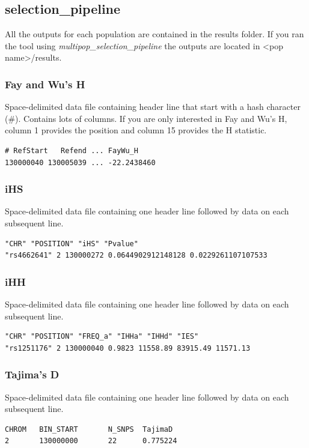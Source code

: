 \documentclass[a4paper,10pt]{article}
\begin{document}
\subsection{selection\_pipeline}
All the outputs for each population are contained in the results folder. If you ran the tool using \emph{multipop\_selection_pipeline} the outputs are located in <pop name>/results. 
\subsubsection{Fay and Wu's H}
Space-delimited data file containing header line that start with a hash character (\#). Contains lots of columns. If you are only interested in Fay and Wu's H, column 1 provides the position and column 15 provides the H statistic. \\
\begin{verbatim}
# RefStart   Refend ... FayWu_H
130000040 130005039 ... -22.2438460
\end{verbatim}
\subsubsection{iHS}
Space-delimited data file containing one header line followed by data on each subsequent line.\\
\begin{verbatim}
"CHR" "POSITION" "iHS" "Pvalue"
"rs4662641" 2 130000272 0.0644902912148128 0.0229261107107533
\end{verbatim}
\subsubsection{iHH}
Space-delimited data file containing one header line followed by data on each subsequent line.\\
\begin{verbatim}
"CHR" "POSITION" "FREQ_a" "IHHa" "IHHd" "IES"
"rs1251176" 2 130000040 0.9823 11558.89 83915.49 11571.13
\end{verbatim}
\subsubsection{Tajima's D}
Space-delimited data file containing one header line followed by data on each subsequent line.\\
\begin{verbatim}
CHROM   BIN_START       N_SNPS  TajimaD
2       130000000       22      0.775224
\end{verbatim}
\end{document}
